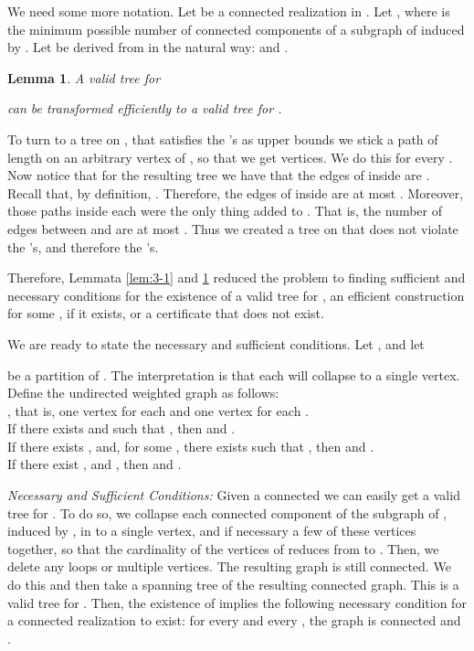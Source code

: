 \documentclass[12pt,a4paper]{article}
\theoremstyle{definition}
\theoremstyle{plain}
\newtheorem{lemma}[dfn]{Lemma}
\newenvironment{prf}{\noindent {\bf Proof.}}{\begin{flushright}\vspace{-2em}\footnotesize\normalsize\end{flushright}\smallskip}
\begin{document}
We need some more notation.
Let  be a connected realization in
.
Let ,
where 
is the minimum possible number of connected components of a subgraph of 
induced by .
Let 
be derived from  in the natural way:
 and
.
\begin{lemma}
\label{lem:3-2}
A valid tree  for

can be transformed efficiently to a valid tree  for .
\end{lemma}
\begin{prf}
To turn  to a tree  on
, that satisfies the 's as upper bounds 
we stick a path of length 
on an arbitrary vertex of , so that we get 
vertices. We do this for every .
Now notice that for the resulting tree  we have
that the edges of  inside  are 
. Recall that,
by definition, . Therefore,
the edges of  inside  are at most . 
Moreover,
those paths inside each  were the only thing added to . 
That is, the number of edges between  and  are
at most
.
Thus we created a tree  on  that does not violate the
's, and therefore the 's.
\end{prf}


Therefore, Lemmata \ref{lem:3-1} and \ref{lem:3-2} reduced the problem 
to finding sufficient and necessary conditions for the existence
of a valid tree  for ,
an efficient construction
for some , if it exists,
or a certificate that  does not exist.

We are ready to state the necessary and sufficient conditions. 
Let ,
and let

be a partition of . The interpretation is that each  will collapse to a single vertex.
Define the undirected weighted graph
 as follows:\\
 ,
that is, one vertex  for each  and one vertex  for each
                   .\\
 If there exists 
and  such that , then
 and
.  \\
 If there exists ,
and, for some , there exists 
such that , then 
and .  \\
 If there exist ,
 and ,
then  and
.\smallskip

\noindent
{\it Necessary  and Sufficient Conditions:}
Given a connected  we can easily get a valid
tree   for .
To do so, we collapse each connected component of the subgraph  of , induced
by , in to a single vertex, and if necessary a few of these vertices together, 
so that the cardinality of the vertices of  reduces from  to . 
Then, we delete any loops or multiple vertices. The resulting graph is still connected. We do this 
 and then take a spanning tree of the resulting connected graph. This is a valid
tree   for .
Then, the existence of
 implies 
the following necessary condition for a connected realization to exist:
for every  and every ,
the graph  is connected
and .
\end{document}
